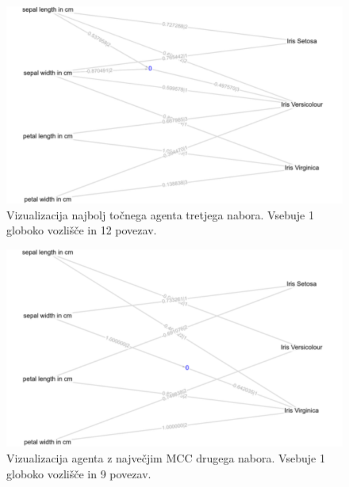 \begin{figure}[H]
    \begin{center}
        \includegraphics[width=13cm]{iris/3/acc_g}
    \end{center}
    \caption{Vizualizacija najbolj točnega agenta tretjega nabora. Vsebuje 1 globoko vozlišče in 12 povezav.}
    \label{fig:iris_acc_3_g}
\end{figure}

\begin{figure}[H]
    \begin{center}
        \includegraphics[width=13cm]{iris/3/mcc_g}
    \end{center}
    \caption{Vizualizacija agenta z največjim MCC drugega nabora. Vsebuje 1 globoko vozlišče in 9 povezav.}
    \label{fig:iris_mcc_3_g}
\end{figure}